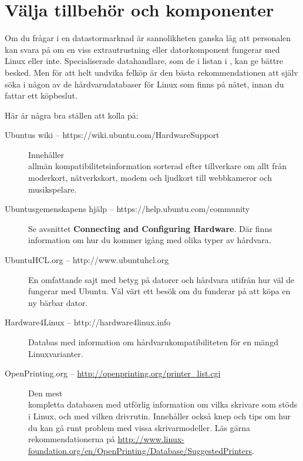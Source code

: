 \documentclass[a4paper,final]{memoir} %
\begin{document}
\section{Välja tillbehör och komponenter}

Om du frågar i en datastormarknad är sannolikheten ganska låg att personalen kan svara på om en viss extrautrustning eller datorkomponent fungerar med Linux eller inte. Specialiserade datahandlare, som de i listan i , kan ge bättre besked. Men för att helt undvika felköp är den bästa rekommendationen att själv söka i någon av de hårdvarudatabaser för Linux som finns på nätet, innan du fattar ett köpbeslut.

Här är några bra ställen att kolla på:

\begin{description}

\item[Ubuntus wiki -- https://wiki.ubuntu.com/HardwareSupport] Innehåller\\\noindent allmän kompatibilitetsinformation sorterad efter tillverkare om allt från moderkort, nätverkskort, modem och ljudkort till webbkameror och musikspelare.

\item[Ubuntusgemenskapens hjälp -- https://help.ubuntu.com/community] Se avsnittet \textbf{Connecting and Configuring Hardware}. Där finns information om hur du kommer igång med olika typer av hårdvara.

\item[UbuntuHCL.org -- http://www.ubuntuhcl.org] En omfattande sajt med betyg på datorer och hårdvara utifrån hur väl de fungerar med Ubuntu. Väl värt ett besök om du funderar på att köpa en ny bärbar dator.

\item[Hardware4Linux -- http://hardware4linux.info] Databas med information om hårdvarukompatibiliteten för en mängd Linuxvarianter.

\item[OpenPrinting.org --  \url{http://openprinting.org/printer_list.cgi}] Den mest\\\noindent kompletta databasen med utförlig information om vilka skrivare som stöds i Linux, och med vilken drivrutin. Innehåller också knep och tips om hur du kan gå runt problem med vissa skrivarmodeller. Läs gärna rekommendationerna på \url{http://www.linux-foundation.org/en/OpenPrinting/Database/SuggestedPrinters}.

\end{description}
\end{document}
